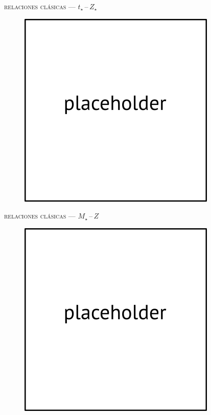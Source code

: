 \documentclass[xcolor=dvipsnames,4pt,hyperref={colorlinks,citecolor=black,linkcolor=black,urlcolor=black}]{beamer}
\begin{document}
\begin{frame}{\textsc{relaciones clásicas --- $t_\star\,$--$\,Z_\star$}}

\begin{figure}
\includegraphics[scale=1]{img/placeholder}
\end{figure}
\end{frame}

\begin{frame}{\textsc{relaciones clásicas --- $M_\star\,$--$\,Z$}}

\begin{figure}
\includegraphics[scale=1]{img/placeholder}
\end{figure}
\end{frame}
\end{document}
